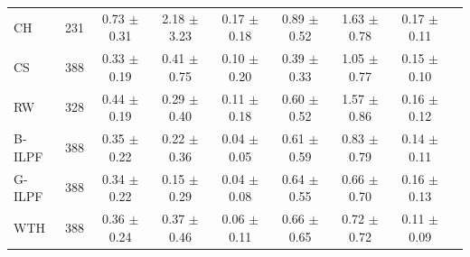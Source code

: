 \documentclass[iucr,review]{iucrjournals}
\begin{document}
\begin{table}[t]
\begin{tabular}{@{}lcccccccc@{}}
CH & 231 & 0.73 $\pm$ 0.31 & 2.18 $\pm$ 3.23 & 0.17 $\pm$ 0.18 & 0.89 $\pm$ 0.52 & 1.63 $\pm$ 0.78 & 0.17 $\pm$ 0.11 \\
CS & 388 & 0.33 $\pm$ 0.19 & 0.41 $\pm$ 0.75 & 0.10 $\pm$ 0.20 & 0.39 $\pm$ 0.33 & 1.05 $\pm$ 0.77 & 0.15 $\pm$ 0.10 \\
RW & 328 & 0.44 $\pm$ 0.19 & 0.29 $\pm$ 0.40 & 0.11 $\pm$ 0.18 & 0.60 $\pm$ 0.52 & 1.57 $\pm$ 0.86 & 0.16 $\pm$ 0.12 \\
B-ILPF & 388 & 0.35 $\pm$ 0.22 & 0.22 $\pm$ 0.36 & 0.04 $\pm$ 0.05 & 0.61 $\pm$ 0.59 & 0.83 $\pm$ 0.79 & 0.14 $\pm$ 0.11 \\
G-ILPF & 388 & 0.34 $\pm$ 0.22 & 0.15 $\pm$ 0.29 & 0.04 $\pm$ 0.08 & 0.64 $\pm$ 0.55 & 0.66 $\pm$ 0.70 & 0.16 $\pm$ 0.13 \\
WTH & 388 & 0.36 $\pm$ 0.24 & 0.37 $\pm$ 0.46 & 0.06 $\pm$ 0.11 & 0.66 $\pm$ 0.65 & 0.72 $\pm$ 0.72 & 0.11 $\pm$ 0.09 \\
\bottomrule
\end{tabular}
\end{table}


\end{document}
